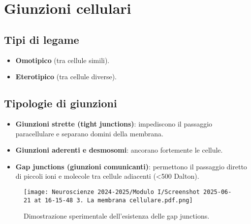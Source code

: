 \documentclass[a4paper,12pt]{article}
\begin{document}
\section*{Giunzioni cellulari}

\subsection*{Tipi di legame}
\begin{itemize}
    \item \textbf{Omotipico} (tra cellule simili).
    \item \textbf{Eterotipico} (tra cellule diverse).
\end{itemize}

\subsection*{Tipologie di giunzioni}
\begin{itemize}
    \item \textbf{Giunzioni strette (tight junctions)}: impediscono il passaggio paracellulare e separano domini della membrana.
    \item \textbf{Giunzioni aderenti e desmosomi}: ancorano fortemente le cellule.
    \item \textbf{Gap junctions (giunzioni comunicanti)}: permettono il passaggio diretto di piccoli ioni e molecole tra cellule adiacenti (\textless 500 Dalton).
\end{itemize}

\begin{figure}[h!]
    \centering
    \texttt{[image: Neuroscienze 2024-2025/Modulo I/Screenshot 2025-06-21 at 16-15-48 3. La membrana cellulare.pdf.png]}
    \caption{Dimostrazione sperimentale dell’esistenza delle gap junctions.}
\end{figure}
\end{document}

